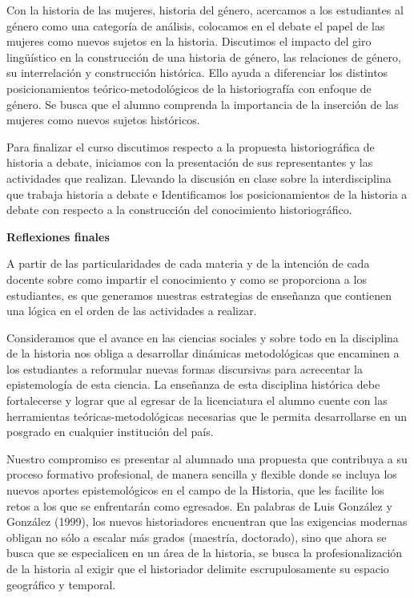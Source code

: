 Con la historia de las mujeres, historia del género, acercamos a los 
estudiantes al género como una categoría de análisis, colocamos en el 
debate el papel de las mujeres como nuevos sujetos en la historia. 
Discutimos el impacto del giro lingüístico en la construcción de una 
historia de género, las relaciones de género, su interrelación y 
construcción histórica. Ello ayuda a diferenciar los distintos 
posicionamientos teórico{-}metodológicos de la historiografía con enfoque 
de género. Se busca que el alumno comprenda la importancia de la 
inserción de las mujeres como nuevos sujetos históricos.


Para finalizar el curso discutimos respecto a la propuesta 
historiográfica de historia a debate, iniciamos con la presentación de 
sus representantes y las actividades que realizan. Llevando la 
discusión en clase sobre la interdisciplina que trabaja historia a 
debate e Identificamos los posicionamientos de la historia a debate con 
respecto a la construcción del conocimiento historiográfico. 


\bigskip
\textbf{Reflexiones finales}

A partir de las particularidades de cada materia y de la intención de 
cada docente sobre como impartir el conocimiento y como se proporciona 
a los estudiantes, es que generamos nuestras estrategias de enseñanza 
que contienen una lógica en el orden de las actividades a realizar.


Consideramos que el avance en las ciencias sociales y sobre todo en la 
disciplina de la historia nos obliga a desarrollar dinámicas 
metodológicas que encaminen a los estudiantes a reformular nuevas 
formas discursivas para acrecentar la epistemología de esta ciencia. La 
enseñanza de esta disciplina histórica debe fortalecerse y lograr que 
al egresar de la licenciatura el alumno cuente con las herramientas 
teóricas-metodológicas necesarias que le permita desarrollarse en un 
posgrado en cualquier institución del país.

Nuestro compromiso es presentar al alumnado una propuesta que contribuya a su
proceso formativo profesional, de manera sencilla y flexible donde se incluya
los nuevos aportes epistemológicos en el campo de la Historia, que les facilite
los retos a los que se enfrentarán como egresados. En palabras de Luis González
y González (1999), los nuevos historiadores encuentran que las exigencias
modernas obligan no sólo a escalar más grados (maestría, doctorado), sino que
ahora se busca que se especialicen en un área de la historia, se busca la
profesionalización de la historia al exigir que el historiador delimite
escrupulosamente su espacio geográfico y temporal.


